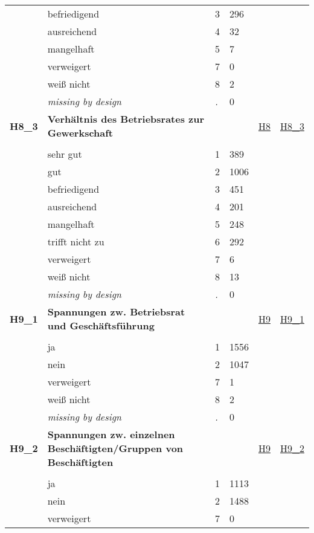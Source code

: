 \begin{longtable}{| L{2.45cm} | L{6cm} | C{1.5cm} | R{1cm} | C{2.25cm} | C{2.25cm} |}
   & befriedigend & 3 & 296 &  &  \\ 
   & ausreichend & 4 & 32 &  &  \\ 
   & mangelhaft & 5 & 7 &  &  \\ 
   & verweigert & 7 & 0 &  &  \\ 
   & weiß nicht & 8 & 2 &  &  \\ 
   & \textit{missing by design} & \textit{.} & 0 &  &  \\ 
   \midrule
\textbf{H8\_3}\label{var:H8:3} & \textbf{Verhältnis des Betriebsrates zur Gewerkschaft} &  &  & \hyperref[H8]{H8} & \hyperref[var:suf:H8:3]{H8\_3} \\ 
   &  &  &  &  &  \\ 
   & sehr gut & 1 & 389 &  &  \\ 
   & gut & 2 & 1006 &  &  \\ 
   & befriedigend & 3 & 451 &  &  \\ 
   & ausreichend & 4 & 201 &  &  \\ 
   & mangelhaft & 5 & 248 &  &  \\ 
   & trifft nicht zu & 6 & 292 &  &  \\ 
   & verweigert & 7 & 6 &  &  \\ 
   & weiß nicht & 8 & 13 &  &  \\ 
   & \textit{missing by design} & \textit{.} & 0 &  &  \\ 
   \midrule
\textbf{H9\_1}\label{var:H9:1} & \textbf{Spannungen zw. Betriebsrat und Geschäftsführung} &  &  & \hyperref[H9]{H9} & \hyperref[var:suf:H9:1]{H9\_1} \\ 
   &  &  &  &  &  \\ 
   & ja & 1 & 1556 &  &  \\ 
   & nein & 2 & 1047 &  &  \\ 
   & verweigert & 7 & 1 &  &  \\ 
   & weiß nicht & 8 & 2 &  &  \\ 
   & \textit{missing by design} & \textit{.} & 0 &  &  \\ 
   \midrule
\textbf{H9\_2}\label{var:H9:2} & \textbf{Spannungen zw. einzelnen Beschäftigten/Gruppen von Beschäftigten} &  &  & \hyperref[H9]{H9} & \hyperref[var:suf:H9:2]{H9\_2} \\ 
   &  &  &  &  &  \\ 
   & ja & 1 & 1113 &  &  \\ 
   & nein & 2 & 1488 &  &  \\ 
   & verweigert & 7 & 0 &  &  \\ 

\end{longtable}
